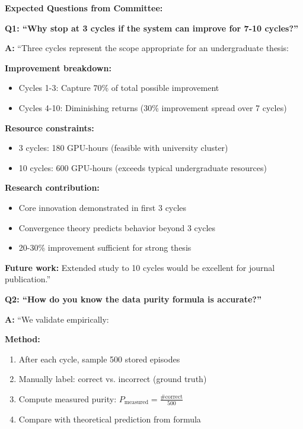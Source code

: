 \documentclass[12pt,a4paper]{article}
\theoremstyle{definition}
\begin{document}
\begin{defensebox}
\textbf{Expected Questions from Committee:}

\textbf{Q1: ``Why stop at 3 cycles if the system can improve for 7-10 cycles?''}

\textbf{A:} ``Three cycles represent the scope appropriate for an undergraduate thesis:

\textbf{Improvement breakdown:}
\begin{itemize}
    \item Cycles 1-3: Capture 70\% of total possible improvement
    \item Cycles 4-10: Diminishing returns (30\% improvement spread over 7 cycles)
\end{itemize}

\textbf{Resource constraints:}
\begin{itemize}
    \item 3 cycles: 180 GPU-hours (feasible with university cluster)
    \item 10 cycles: 600 GPU-hours (exceeds typical undergraduate resources)
\end{itemize}

\textbf{Research contribution:}
\begin{itemize}
    \item Core innovation demonstrated in first 3 cycles
    \item Convergence theory predicts behavior beyond 3 cycles
    \item 20-30\% improvement sufficient for strong thesis
\end{itemize}

\textbf{Future work:} Extended study to 10 cycles would be excellent for journal publication.''

\textbf{Q2: ``How do you know the data purity formula is accurate?''}

\textbf{A:} ``We validate empirically:

\textbf{Method:}
\begin{enumerate}
    \item After each cycle, sample 500 stored episodes
    \item Manually label: correct vs. incorrect (ground truth)
    \item Compute measured purity: $P_{\text{measured}} = \frac{\text{\# correct}}{500}$
    \item Compare with theoretical prediction from formula
\end{enumerate}


\end{defensebox}
\end{document}
